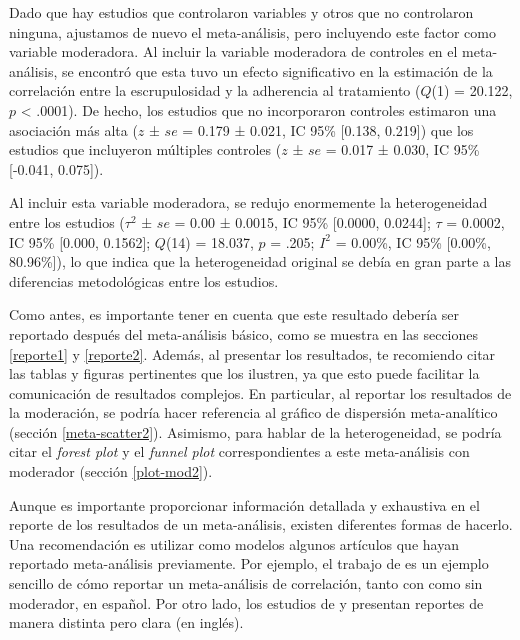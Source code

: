 \documentclass[
  bookmarksnumbered]{article}
\begin{document}
\begin{tcolorbox}[enhanced,attach boxed title to top center={yshift=-3mm,yshifttext=-1mm},
  colback=iacol!5!white,colframe=iacol!75!white,colbacktitle=iacol,
  title=Ejemplo de reporte con moderador categórico,fonttitle=\bfseries, parbox=false,
  boxed title style={size=small,colframe=iacol} ]
  
Dado que hay estudios que controlaron variables y otros que no controlaron ninguna, ajustamos de nuevo el meta-análisis, pero incluyendo este factor como variable moderadora. Al incluir la variable moderadora de controles en el meta-análisis, se encontró que esta tuvo un efecto significativo en la estimación de la correlación entre la escrupulosidad y la adherencia al tratamiento ($Q$(1) = 20.122, $p$ < .0001). De hecho, los estudios que no incorporaron controles estimaron una asociación más alta ($z$ ± $se$ = 0.179 ± 0.021, IC 95\% [0.138, 0.219]) que los estudios que incluyeron múltiples controles ($z$ ± $se$ = 0.017 ± 0.030, IC 95\% [-0.041, 0.075]).

Al incluir esta variable moderadora, se redujo enormemente la heterogeneidad entre los estudios ($\tau^2$ ± $se$ =  0.00 ± 0.0015, IC 95\% [0.0000, 0.0244]; $\tau$ = 0.0002, IC 95\% [0.000, 0.1562]; $Q$(14) = 18.037, $p$ = .205; $I^2$ = 0.00\%, IC 95\% [0.00\%, 80.96\%]), lo que indica que la heterogeneidad original se debía en gran parte a las diferencias metodológicas entre los estudios.  

\end{tcolorbox}

Como antes, es importante tener en cuenta que este resultado debería ser reportado después del meta-análisis básico, como se muestra en las secciones \ref{reporte1} y \ref{reporte2}. Además, al presentar los resultados, te recomiendo citar las tablas y figuras pertinentes que los ilustren, ya que esto puede facilitar la comunicación de resultados complejos. En particular, al reportar los resultados de la moderación, se podría hacer referencia al gráfico de dispersión meta-analítico (sección \ref{meta-scatter2}). Asimismo, para hablar de la heterogeneidad, se podría citar el \emph{forest plot} y el \emph{funnel plot} correspondientes a este meta-análisis con moderador (sección \ref{plot-mod2}).

Aunque es importante proporcionar información detallada y exhaustiva en el reporte de los resultados de un meta-análisis, existen diferentes formas de hacerlo. Una recomendación es utilizar como modelos algunos artículos que hayan reportado meta-análisis previamente. Por ejemplo, el trabajo de \textcite{hidalgo-fuentesUsoProblematicoInternet2022} es un ejemplo sencillo de cómo reportar un meta-análisis de correlación, tanto con como sin moderador, en español. Por otro lado, los estudios de \textcite{salsmanMetaanalyticApproachExamining2015} y \textcite{shiCorrelationAdherenceRates2010} presentan reportes de manera distinta pero clara (en inglés).
\end{document}
